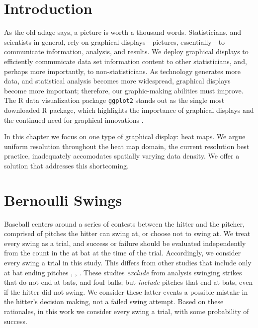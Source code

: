 
\section{Introduction}

As the old adage says, a picture is worth a thousand words. Statisticians, and scientists in general, rely on graphical displays---pictures, essentially---to communicate information, analysis, and results. We deploy graphical displays to efficiently communicate data set information content to other statisticians, and, perhaps more importantly, to non-statisticians. As technology generates more data, and statistical analysis becomes more widespread, graphical displays become more important; therefore, our graphic-making abilities must improve. The R data visualization package \verb|ggplot2| stands out as the single most downloaded R package, which highlights the importance of graphical displays and the continued need for graphical innovations \citep{rdoc}.

In this chapter we focus on one type of graphical display: heat maps. We argue uniform resolution throughout the heat map domain, the current resolution best practice, inadequately accomodates spatially varying data density. We offer a solution that addresses this shortcoming.

\section{Bernoulli Swings}


Baseball centers around a series of contests between the hitter and the pitcher, comprised of pitches the hitter can swing at, or choose not to swing at. We treat every swing as a trial, and success or failure should be evaluated independently from the count in the at bat at the time of the trial. Accordingly, we consider every swing a trial in this study.  This differs from other studies that include only at bat ending pitches \citep{Cross2015}, \citep{Baumer2010}, \citep{Fast2011}. These studies {\it exclude} from analysis swinging strikes that do not end at bats, and foul balls; but {\it include} pitches that end at bats, even if the hitter did not swing. We consider these latter events a possible mistake in the hitter's decision making, not a failed swing attempt. Based on these rationales, in this work we consider every swing a trial, with some probability of success. 

